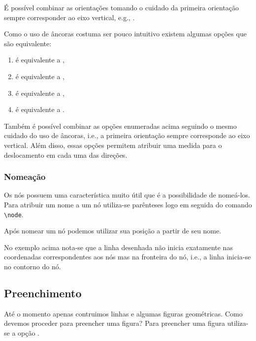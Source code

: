 É possível combinar as orientações tomando o cuidado da primeira orientação sempre corresponder ao eixo vertical, e.g., . \\

Como o uso de âncoras costuma ser pouco intuitivo existem algumas opções que são equivalente:
\begin{enumerate}
    \item {} é equivalente a ,
    \item {} é equivalente a ,
    \item {} é equivalente a ,
    \item {} é equivalente a .
\end{enumerate}

Também é possível combinar as opções enumeradas acima seguindo o mesmo cuidado do uso de âncoras, i.e., a primeira orientação sempre corresponde ao eixo vertical. Além disso, essas opções permitem atribuir uma medida para o deslocamento em cada uma das direções. \\

\subsubsection{Nomeação}
Os nós possuem uma característica muito útil que é a possibilidade de nomeá-los. Para atribuir um nome a um nó utiliza-se parênteses logo em seguida do comando \lstinline!\node!. \\

Após nomear um nó podemos utilizar sua posição a partir de seu nome. \\

No exemplo acima nota-se que a linha desenhada não inicia exatamente nas coordenadas correspondentes aos nós mas na fronteira do nó, i.e., a linha inicia-se no contorno do nó. \\

\subsection{Preenchimento}
Até o momento apenas contruimos linhas e algumas figuras geométricas. Como devemos proceder para preencher uma figura? Para preencher uma figura utiliza-se a opção . \\

